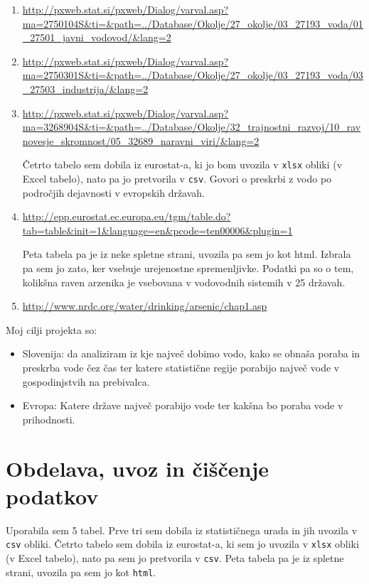 \documentclass[11pt,a4paper]{article}
\begin{document}
\begin{enumerate} 
\item{\url{http://pxweb.stat.si/pxweb/Dialog/varval.asp?ma=2750104S&ti=&path=../Database/Okolje/27_okolje/03_27193_voda/01_27501_javni_vodovod/&lang=2}}

\item{\url{http://pxweb.stat.si/pxweb/Dialog/varval.asp?ma=2750301S&ti=&path=../Database/Okolje/27_okolje/03_27193_voda/03_27503_industrija/&lang=2}}

\item{\url{http://pxweb.stat.si/pxweb/Dialog/varval.asp?ma=3268904S&ti=&path=../Database/Okolje/32_trajnostni_razvoj/10_ravnovesje_skromnost/05_32689_naravni_viri/&lang=2}}

Četrto tabelo sem dobila iz eurostat-a, ki jo bom uvozila v \verb|xlsx| obliki (v Excel tabelo), nato pa jo pretvorila v \verb|csv|. Govori o preskrbi z vodo po področjih dejavnosti v evropskih državah.

\item{\url{http://epp.eurostat.ec.europa.eu/tgm/table.do?tab=table&init=1&language=en&pcode=ten00006&plugin=1}}

Peta tabela pa je iz neke spletne strani, uvozila pa sem jo kot html. Izbrala pa sem jo zato, ker vsebuje urejenostne spremenljivke. Podatki pa so o tem, kolikšna raven arzenika je vsebovana v vodovodnih sistemih v 25 državah.

\item{\url{http://www.nrdc.org/water/drinking/arsenic/chap1.asp}}
\end{enumerate}
Moj cilji projekta so:
\begin{itemize}
\item{Slovenija: da analiziram iz kje največ dobimo vodo, kako se obnaša poraba in preskrba vode čez čas ter katere statistične regije porabijo največ vode v gospodinjstvih na prebivalca.} 
\item{Evropa: Katere države največ porabijo vode ter kakšna bo poraba vode v prihodnosti.}
\end{itemize}
\newpage

\section{Obdelava, uvoz in čiščenje podatkov}

Uporabila sem 5 tabel.
Prve tri sem dobila iz statističnega urada in jih uvozila v \verb|csv| obliki.
Četrto tabelo sem dobila iz eurostat-a, ki sem jo uvozila v \verb|xlsx| obliki (v Excel tabelo), nato pa sem jo pretvorila v \verb|csv|. Peta tabela pa je iz spletne strani, uvozila pa sem jo kot \verb|html|.
\end{document}
